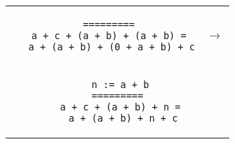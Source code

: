 \begin{landscape}
\begin{small}
\begin{multicols*}{3}[\begin{center}\section*{}\end{center}]
  \begin{tabular}{cc}
  \begin{minipage}{0.22\textwidth}\begin{lstlisting}
  =========
  a + c + (a + b) + (a + b) =
   a + (a + b) + (0 + a + b) + c
  \end{lstlisting}\end{minipage}
  & $\to$\\
  \begin{minipage}{0.22\textwidth}\begin{lstlisting}
      n := a + b
     =========
      a + c + (a + b) + n =
       a + (a + b) + n + c
  \end{lstlisting}\end{minipage}
  \end{tabular}

\end{multicols*}

\end{small}
\end{landscape}
\restoregeometry
\pagestyle{headings}
